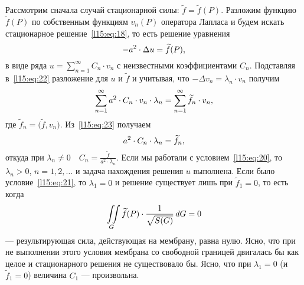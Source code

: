 Рассмотрим сначала случай стационарной силы: $\widetilde{f}=\widetilde{f}(P)$. Разложим функцию $\widetilde{f}(P)$ по собственным функциям $v_n(P)$ оператора Лапласа и будем искать стационарное решение~\eqref{l15:eq:18}, то есть решение уравнения
\begin{equation}\label{l15:eq:22}
	\hfill-a^2\cdot\Delta u=\widetilde{f}(P),\hfill
\end{equation}
в виде ряда $\displaystyle u=\sum\limits_{n=1}^{\infty}C_n\cdot v_n$ с неизвестными коэффициентами $C_n$. Подставляя в~\eqref{l15:eq:22} разложение для $u$ и $\widetilde{f}$ и учитывая, что $-\Delta v_n=\lambda_n\cdot v_n$ получим
\begin{equation}\label{l15:eq:23}
	\hfill\sum\limits_{n=1}^{\infty}a^2\cdot C_n\cdot v_n\cdot\lambda_n=\sum\limits_{n=1}^{\infty}\widetilde{f}_n\cdot v_n,\hfill
\end{equation}
где $\widetilde{f}_n=\big(\widetilde{f},v_n\big)$. Из~\eqref{l15:eq:23} получаем
\begin{equation*}
	\hfill a^2\cdot C_n\cdot\lambda_n=\widetilde{f}_n,\hfill
\end{equation*}
откуда при $\lambda_n\neq0\quad$$\displaystyle C_n=\frac{\widetilde{f}}{a^2\cdot\lambda_n}$. Если мы работали с условием~\eqref{l15:eq:20}, то $\lambda_n>0$, $n=1,2,\ldots$ и задача нахождения решения $u$ выполнена. Если было условие~\eqref{l15:eq:21}, то $\lambda_1=0$ и решение существует лишь при $\widetilde{f}_1=0$, то есть когда 
\begin{equation*}
	\hfill\iint\limits_{G} \widetilde{f}(P)\cdot\frac{1}{\sqrt{S(G)}}\,dG=0\hfill
\end{equation*}
--- результирующая сила, действующая на мембрану, равна нулю. Ясно, что при не выполнении этого условия мембрана со свободной границей двигалась бы как целое и стационарного решения не существовало бы. Ясно, что при $\lambda_1=0$ (и $\widetilde{f}_1=0$) величина $C_1$ --- произвольна.  

